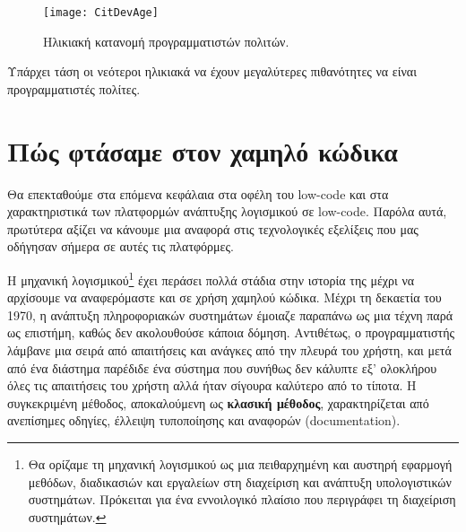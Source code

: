                     \begin{figure}[H] \noindent \centering
                            \texttt{[image: CitDevAge]}
                            \caption{Ηλικιακή κατανομή προγραμματιστών πολιτών. \cite{CitDevTrackVia}}
                    \end{figure}

                    \vspace{-2.5em}
                    \begin{displayquote}
                        \small Υπάρχει τάση οι νεότεροι ηλικιακά να έχουν μεγαλύτερες πιθανότητες να είναι προγραμματιστές πολίτες.
                    \end{displayquote}


    \section{Πώς φτάσαμε στον χαμηλό κώδικα}
        Θα επεκταθούμε στα επόμενα κεφάλαια στα οφέλη του low-code και στα χαρακτηριστικά των πλατφορμών ανάπτυξης λογισμικού σε low-code. Παρόλα αυτά, πρωτύτερα αξίζει να κάνουμε μια αναφορά στις τεχνολογικές εξελίξεις που μας οδήγησαν σήμερα σε αυτές τις πλατφόρμες.

        Η μηχανική λογισμικού\footnote{Θα ορίζαμε τη μηχανική λογισμικού ως μια πειθαρχημένη και αυστηρή εφαρμογή μεθόδων, διαδικασιών και εργαλείων στη διαχείριση και ανάπτυξη υπολογιστικών συστημάτων. Πρόκειται για ένα εννοιλογικό πλαίσιο που περιγράφει τη διαχείριση συστημάτων.} έχει περάσει πολλά στάδια στην ιστορία της μέχρι να αρχίσουμε να αναφερόμαστε και σε χρήση χαμηλού κώδικα. Μέχρι τη δεκαετία του 1970, η ανάπτυξη πληροφοριακών συστημάτων έμοιαζε παραπάνω ως μια τέχνη παρά ως επιστήμη, καθώς δεν ακολουθούσε κάποια δόμηση. Αντιθέτως, ο προγραμματιστής λάμβανε μια σειρά από απαιτήσεις και ανάγκες από την πλευρά του χρήστη, και μετά από ένα διάστημα παρέδιδε ένα σύστημα που συνήθως δεν κάλυπτε εξ' ολοκλήρου όλες τις απαιτήσεις του χρήστη αλλά ήταν σίγουρα καλύτερο από το τίποτα. Η συγκεκριμένη μέθοδος, αποκαλούμενη ως \textbf{κλασική μέθοδος}, χαρακτηρίζεται από ανεπίσημες οδηγίες, έλλειψη τυποποίησης και αναφορών (documentation).

